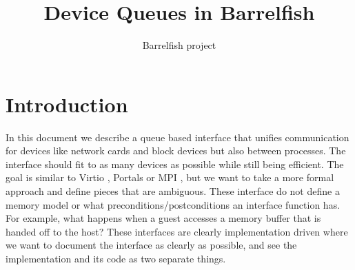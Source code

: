 \documentclass[a4paper,11pt,twoside]{report}
\title{Device Queues in Barrelfish}
\author{Barrelfish project}
\begin{document}
	\maketitle			%
	
	\begin{versionhistory}
	\end{versionhistory}
	
	\tableofcontents		%
	\cleardoublepage
	\setcounter{secnumdepth}{2}

	\newcommand{\todo}[1]{[\textcolor{red}{\emph{#1}}]}

	\newcommand{\virtio}{Virtio }
	\newcommand{\devif}{Devif }
	\newcommand{\ep}[1]{$Ep_{#1}$}


	
	
	
	
	\chapter{Introduction}
	In this document we describe a queue based interface that unifies communication for 
	devices like network cards and block devices but also between processes. 
	The interface should fit to as many devices as possible while still being efficient.
	The goal is similar to \virtio \cite{virtio:sigops}, Portals \cite{portals} or MPI \cite{mpi}, 
	but we want to take a more formal 
	approach and define pieces that are ambiguous. These interface do not define a memory model 
	or what preconditions/postconditions an interface function has. 
	For example, what happens when a guest accesses a memory buffer that is handed off 
	to the host? These interfaces are clearly implementation driven where 
	we want to document the interface as clearly as possible, and see the implementation and
	its code as two separate things.
	
\end{document}
